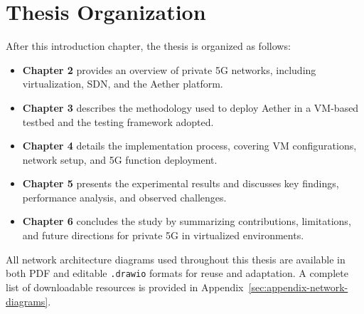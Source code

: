 \section{Thesis Organization}

After this introduction chapter, the thesis is organized as follows:

\begin{itemize}
    \item \textbf{Chapter 2} provides an overview of private 5G networks, including virtualization, SDN, and the Aether platform.
    \item \textbf{Chapter 3} describes the methodology used to deploy Aether in a VM-based testbed and the testing framework adopted.
    \item \textbf{Chapter 4} details the implementation process, covering VM configurations, network setup, and 5G function deployment.
    \item \textbf{Chapter 5} presents the experimental results and discusses key findings, performance analysis, and observed challenges.
    \item \textbf{Chapter 6} concludes the study by summarizing contributions, limitations, and future directions for private 5G in virtualized environments.
\end{itemize}

All network architecture diagrams used throughout this thesis are available in both PDF and editable \texttt{.drawio} formats for reuse and adaptation. A complete list of downloadable resources is provided in Appendix~\ref{sec:appendix-network-diagrams}.
